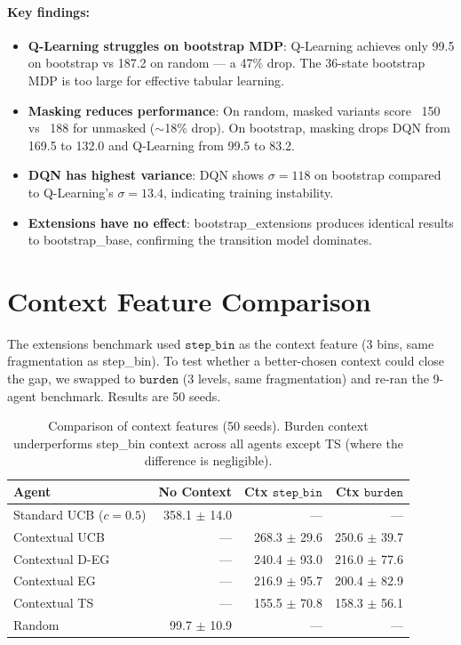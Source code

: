 \documentclass[11pt]{article}
\begin{document}
\paragraph{Key findings:}
\begin{itemize}
\item \textbf{Q-Learning struggles on bootstrap MDP}: Q-Learning achieves only 99.5 on bootstrap vs 187.2 on random --- a 47\% drop. The 36-state bootstrap MDP is too large for effective tabular learning.
\item \textbf{Masking reduces performance}: On random, masked variants score ~150 vs ~188 for unmasked ($\sim$18\% drop). On bootstrap, masking drops DQN from 169.5 to 132.0 and Q-Learning from 99.5 to 83.2.
\item \textbf{DQN has highest variance}: DQN shows $\sigma=118$ on bootstrap compared to Q-Learning's $\sigma=13.4$, indicating training instability.
\item \textbf{Extensions have no effect}: bootstrap\_extensions produces identical results to bootstrap\_base, confirming the transition model dominates.
\end{itemize}

\section{Context Feature Comparison}

The extensions benchmark used $\texttt{step\_bin}$ as the context feature (3 bins, same fragmentation as step\_bin). To test whether a better-chosen context could close the gap, we swapped to $\texttt{burden}$ (3 levels, same fragmentation) and re-ran the 9-agent benchmark. Results are 50 seeds.

\begin{table}[h]
\centering
\begin{tabular}{lrrr}
\toprule
Agent & No Context & Ctx $\texttt{step\_bin}$ & Ctx $\texttt{burden}$ \\
\midrule
Standard UCB ($c=0.5$) & 358.1 $\pm$ 14.0 & --- & --- \\
Contextual UCB & --- & 268.3 $\pm$ 29.6 & 250.6 $\pm$ 39.7 \\
Contextual D-EG & --- & 240.4 $\pm$ 93.0 & 216.0 $\pm$ 77.6 \\
Contextual EG & --- & 216.9 $\pm$ 95.7 & 200.4 $\pm$ 82.9 \\
Contextual TS & --- & 155.5 $\pm$ 70.8 & 158.3 $\pm$ 56.1 \\
\midrule
Random & 99.7 $\pm$ 10.9 & --- & --- \\
\bottomrule
\end{tabular}
\caption{Comparison of context features (50 seeds). Burden context underperforms step\_bin context across all agents except TS (where the difference is negligible).}
\end{table}
\end{document}
